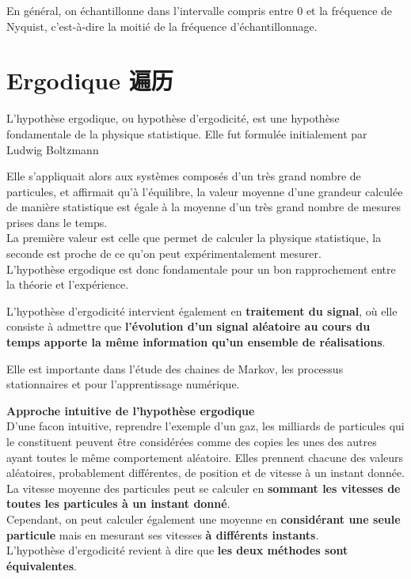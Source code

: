 \documentclass{article}
\begin{document}
En général, on échantillonne dans l'intervalle compris entre 0 et la fréquence de Nyquist, c'est-à-dire la moitié de la fréquence d'échantillonnage.

\section{Ergodique 遍历}
L'hypothèse ergodique, ou hypothèse d'ergodicité, est une hypothèse fondamentale de la physique statistique. Elle fut formulée initialement par Ludwig Boltzmann

Elle s'appliquait alors aux systèmes composés d'un très grand nombre de particules, et affirmait qu'à l'équilibre, la valeur moyenne d'une grandeur calculée de manière statistique est égale à la moyenne d'un très grand nombre de mesures prises dans le temps.\\
La première valeur est celle que permet de calculer la physique statistique, la seconde est proche de ce qu'on peut expérimentalement mesurer.\\
L'hypothèse ergodique est donc fondamentale pour un bon rapprochement entre la théorie et l'expérience.

L'hypothèse d'ergodicité intervient également en \textbf{traitement du signal}, où elle consiste à admettre que \textbf{l'évolution d'un signal aléatoire au cours du temps apporte la même information qu'un ensemble de réalisations}.

Elle est importante dans l'étude des chaines de Markov, les processus stationnaires et pour l'apprentissage numérique.

\textbf{Approche intuitive de l'hypothèse ergodique}\\
D'une facon intuitive, reprendre l'exemple d'un gaz, les milliards de particules qui le constituent peuvent être considérées comme des copies les unes des autres ayant toutes le même comportement aléatoire. 
Elles prennent chacune des valeurs aléatoires, probablement différentes, de position et de vitesse à un instant donnée. \\
La vitesse moyenne des particules peut se calculer en \textbf{sommant les vitesses de toutes les particules à un instant donné}. \\
Cependant, on peut calculer également une moyenne en \textbf{considérant une seule particule} mais en mesurant ses vitesses \textbf{à différents instants}.\\
L'hypothèse d'ergodicité revient à dire que \textbf{les deux méthodes sont équivalentes}.
\end{document}
